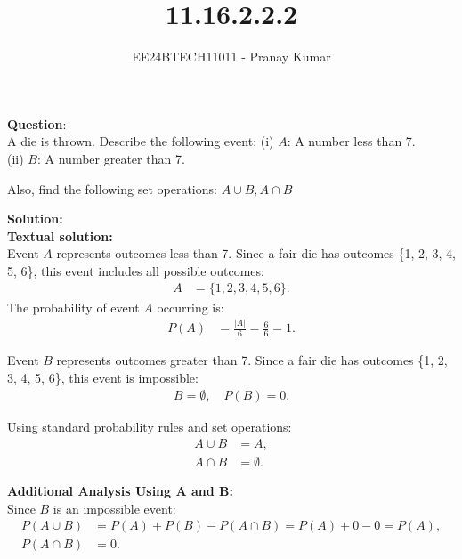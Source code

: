 \documentclass[journal]{IEEEtran}
\begin{document}

\vspace{3cm}

\title{11.16.2.2.2}
\author{EE24BTECH11011 - Pranay Kumar}
\maketitle

\renewcommand{\thefigure}{\theenumi}
\renewcommand{\thetable}{\theenumi}
\setlength{\intextsep}{10pt}

\renewcommand{\thetable}{\theenumi}

\textbf{Question}:\\
A die is thrown. Describe the following event:
(i) \( A \): A number less than 7.\\
(ii) \( B \): A number greater than 7.

Also, find the following set operations: 
\( A \cup B, A \cap B\)

\textbf{Solution: }\\

\textbf{Textual solution: }\\
Event \( A \) represents outcomes less than 7. Since a fair die has outcomes \{1, 2, 3, 4, 5, 6\}, this event includes all possible outcomes:
\begin{align}
    A &= \{1, 2, 3, 4, 5, 6\}.
\end{align}
The probability of event \( A \) occurring is:
\begin{align}
    P(A) &= \frac{|A|}{6} = \frac{6}{6} = 1.
\end{align}

Event \( B \) represents outcomes greater than 7. Since a fair die has outcomes \{1, 2, 3, 4, 5, 6\}, this event is impossible:
\begin{align}
    B = \emptyset, \quad P(B) = 0.
\end{align}

Using standard probability rules and set operations:
\begin{align}
    A \cup B &= A, \\
    A \cap B &= \emptyset.
\end{align}

\textbf{Additional Analysis Using A and B: }\\
Since \( B \) is an impossible event:
\begin{align}
    P(A \cup B) &= P(A) + P(B) - P(A \cap B) = P(A) + 0 - 0 = P(A), \\
    P(A \cap B) &= 0.
\end{align}
\end{document}

